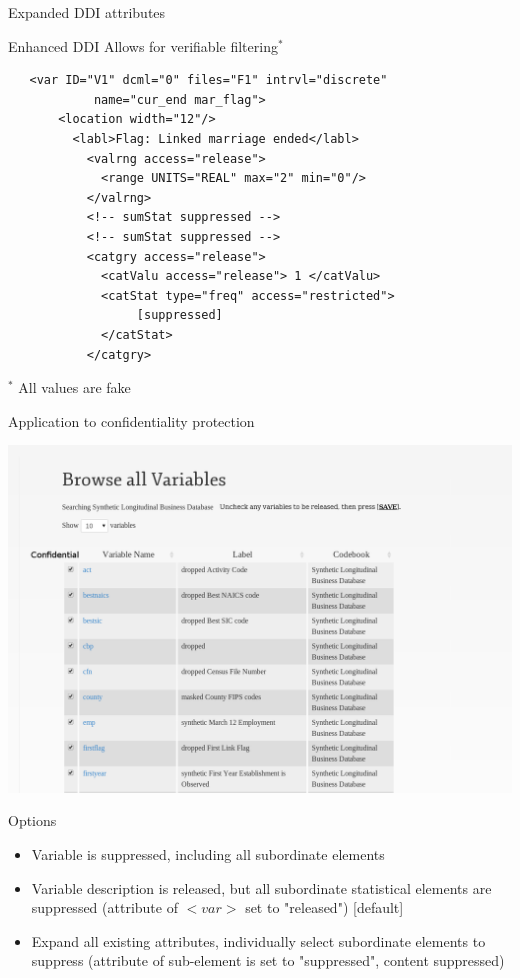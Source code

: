 \begin{frame}[fragile]{Expanded DDI attributes}

\begin{block}{Enhanced DDI}
Allows for verifiable filtering$^*$
\begin{verbatim}
   <var ID="V1" dcml="0" files="F1" intrvl="discrete" 
   			name="cur_end mar_flag">
       <location width="12"/>
         <labl>Flag: Linked marriage ended</labl>
           <valrng access="release">
             <range UNITS="REAL" max="2" min="0"/>
           </valrng>
           <!-- sumStat suppressed -->
           <!-- sumStat suppressed -->
           <catgry access="release">
             <catValu access="release"> 1 </catValu>
             <catStat type="freq" access="restricted"> 
                  [suppressed]
             </catStat>
           </catgry>
\end{verbatim}
\end{block}
\tiny{$^*$ All values are fake}
\end{frame}


\begin{frame}{Application to confidentiality protection}
\begin{center}
\includegraphics[width=1\linewidth]{Screenshot_2013-11-04_13:18:01_mockup}
\end{center}
\end{frame}

\begin{frame}[fragile]{Options}
\begin{itemize}
\item Variable is suppressed, including all subordinate elements
\item Variable description is released, but all subordinate statistical elements are suppressed
          (attribute of $<var>$ set to "released") [default]
\item Expand all existing attributes, individually select subordinate elements to suppress 
(attribute of sub-element is set to "suppressed", content suppressed)
\end{itemize}
\end{frame}


